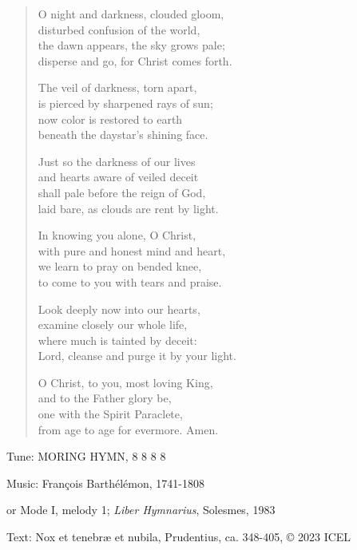 \hymn

\begin{verse}
O night and darkness, clouded gloom,\\
disturbed confusion of the world,\\
the dawn appears, the sky grows pale;\\
disperse and go, for Christ comes forth.

The veil of darkness, torn apart,\\
is pierced by sharpened rays of sun;\\
now color is restored to earth\\
beneath the daystar’s shining face.

Just so the darkness of our lives\\
and hearts aware of veiled deceit\\
shall pale before the reign of God,\\
laid bare, as clouds are rent by light.

In knowing you alone, O Christ,\\
with pure and honest mind and heart,\\
we learn to pray on bended knee,\\
to come to you with tears and praise.

Look deeply now into our hearts,\\
examine closely our whole life,\\
where much is tainted by deceit:\\
Lord, cleanse and purge it by your light.

O Christ, to you, most loving King,\\
and to the Father glory be,\\
one with the Spirit Paraclete,\\
from age to age for evermore. Amen.
\end{verse}

\begin{hymnsource}
Tune: MORING HYMN, 8 8 8 8

Music: François Barthélémon, 1741-1808

or Mode I, melody 1; \emph{Liber Hymnarius}, Solesmes, 1983

Text: Nox et tenebræ et nubila, Prudentius, ca. 348-405, © 2023 ICEL
\end{hymnsource}